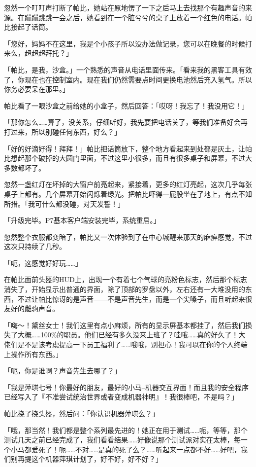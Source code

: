 忽然一个叮叮声打断了帕比，她站在原地愣了一下之后马上去找那个有趣声音的来源。在蹦蹦跳跳一会之后，她看到在一个脏兮兮的桌子上放着一个红色的电话。帕比接起了话筒。

「您好，妈妈不在这里，我是个小孩子所以没办法做记录，您可以在晚餐的时候打来么，超超超拜托？」

「帕比，是我，沙盒。」一个熟悉的声音从电话里面传来。「看来我的黑客工具有效了，你现在也在控制室内。现在我们仍然需要点时间更换电池然后充入氢气。所以你务必要呆在那里。」

帕比看了一眼沙盒之前给她的小盒子，然后回答：「哎呀！我忘了！我没用它！」

「那你怎么……算了，没关系，仔细听好，我先要把电话关了，等我们准备好会再打过来，所以别碰任何东西，好么？」

「好的好滴好得！拜拜！」帕比把话筒放下，整个地方看起来到处都是灰土，让帕比想起那个破掉的大圆门里面，不过这里小很多，而且有很多桌子和屏幕，不过大多数都坏了。

忽然一盏红灯在坏掉的大窗户前亮起来，紧接着，更多的红灯亮起，这次几乎每张桌子上都有。几个屏幕开始闪烁着绿光。把帕比吓得一屁股坐在了地上，有点不知所措。「我可什么都没碰，对天发誓！」

「{\mt 升级完毕。P7基本客户端安装完毕，系统重启。}」

忽然整个衣服都变暗了，帕比又一次体验到了在中心城醒来那天的麻痹感觉，不过这次只持续了几秒。

「呃，这感觉好好玩……」

在帕比面前头盔的HUD上，出现一个有着七个气球的亮粉色标志，然后那个标志消失了，开始显示出普通的界面，除了顶部的罗盘以外，左右还有一大堆没用的东西，不过让帕比惊讶的是声音——不是声音先生，而是一个尖嗓子，而且听起来很友好的雌驹声音。

「嗨～！黛丝女士！我们这里有点小麻烦，所有的显示屏基本都挂了，然后我们损失了大概……100\%的职员。他们已经有多久没来上班了？哇哦……真的好久了！大佬们是不是该考虑提高一下员工福利了……哦哦，别担心！我可以在你的个人终端上操作所有东西。」

「呃，你是谁啊？声音先生去哪了？」

「我是萍琪七号！你最好的朋友，最好的小马--机器交互界面！而且我的安全程序已经写入了『不准尝试统治世界或者变成机器神明』！我很棒吧，不是吗？」

帕比挠了挠头盔，然后问：「你认识机器萍琪么？」

「哦，那当然！我们都是整个系列最先进的！她正在用于测试……呃，等等，那个测试几天之前已经完成了，我们看看结果……好像说那个测试派对实在太棒，每一个小马都爱死了！呃……不对……是真的死了么？……听起来一点都不好……好吧，我们别再提这个机器萍琪计划了，好不好，好不好？」

